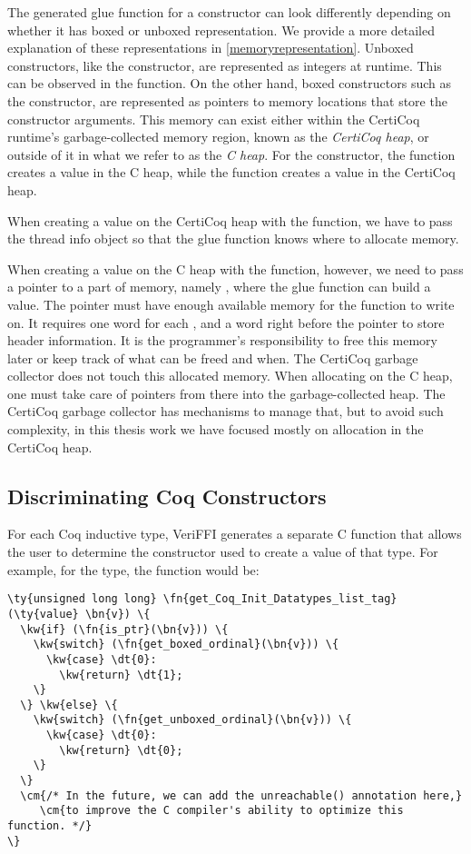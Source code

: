 The generated glue function for a constructor can look differently depending on whether it has \gls{boxed} or \gls{unboxed} representation. We provide a more detailed explanation of these representations in \autoref{memoryrepresentation}.
Unboxed constructors, like the  constructor, are represented as integers at runtime. This can be observed in the \makenil{} function.
On the other hand, boxed constructors such as the  constructor, are represented as pointers to memory locations that store the constructor arguments. This memory can exist either within the CertiCoq runtime's garbage-collected memory region, known as the \emph{\gls{CertiCoq heap}}, or outside of it in what we refer to as the \emph{C heap}.
For the  constructor, the \makecons{} function creates a value in the C heap, while the \allocmakecons{} function creates a value in the \gls{CertiCoq heap}.\newpage

When creating a value on the \gls{CertiCoq heap} with the \allocmakecons{} function, we have to pass the \gls{thread info} object so that the glue function knows where to allocate memory. 

When creating a value on the \gls{C heap} with the \makecons{} function, however, we need to pass a pointer to a part of memory, namely , where the glue function can build a value.
The  pointer must have enough available memory for the function to write on. It requires one word for each \constructor{}, and a word right before the pointer to store header information. It is the programmer's responsibility to free this memory later or keep track of what can be freed and when. The CertiCoq garbage collector does not touch this allocated memory. When allocating on the \gls{C heap}, one must take care of pointers from there into the garbage-collected heap. The CertiCoq garbage collector has mechanisms to manage that, but to avoid such complexity, in this thesis work we have focused mostly on allocation in the \gls{CertiCoq heap}.

\subsection{Discriminating Coq Constructors}

For each Coq \gls{inductive type}, VeriFFI generates a separate C function that allows the user to determine the constructor used to create a value of that type. For example, for the  type, the function would be:

\begin{Verbatim}
\ty{unsigned long long} \fn{get_Coq_Init_Datatypes_list_tag}(\ty{value} \bn{v}) \{
  \kw{if} (\fn{is_ptr}(\bn{v})) \{
    \kw{switch} (\fn{get_boxed_ordinal}(\bn{v})) \{
      \kw{case} \dt{0}:
        \kw{return} \dt{1};
    \}
  \} \kw{else} \{
    \kw{switch} (\fn{get_unboxed_ordinal}(\bn{v})) \{
      \kw{case} \dt{0}:
        \kw{return} \dt{0};
    \}
  \}
  \cm{/* In the future, we can add the unreachable() annotation here,}
     \cm{to improve the C compiler's ability to optimize this function. */}
\}
\end{Verbatim}

